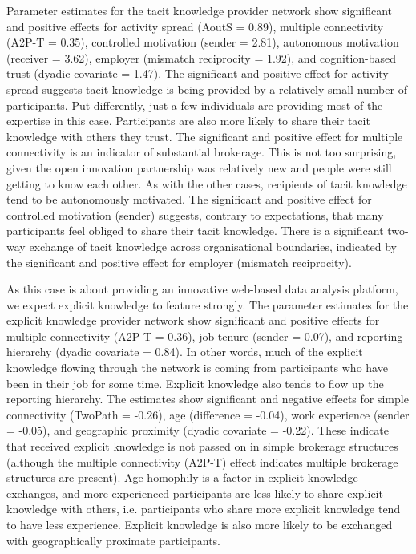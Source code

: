 Parameter estimates for the tacit knowledge provider network show significant and positive effects for activity spread (AoutS = 0.89), multiple connectivity (A2P-T = 0.35), controlled motivation (sender = 2.81), autonomous motivation (receiver = 3.62), employer (mismatch reciprocity = 1.92), and cognition-based trust (dyadic covariate = 1.47). The significant and positive effect for activity spread suggests tacit knowledge is being provided by a relatively small number of participants. Put differently, just a few individuals are providing most of the expertise in this case. Participants are also more likely to share their tacit knowledge with others they trust. The significant and positive effect for multiple connectivity is an indicator of substantial brokerage. This is not too surprising, given the open innovation partnership was relatively new and people were still getting to know each other. As with the other cases, recipients of tacit knowledge tend to be autonomously motivated. The significant and positive effect for controlled motivation (sender) suggests, contrary to expectations, that many participants feel obliged to share their tacit knowledge. There is a significant two-way exchange of tacit knowledge across organisational boundaries, indicated by the significant and positive effect for employer (mismatch reciprocity). \medskip

As this case is about providing an innovative web-based data analysis platform, we expect explicit knowledge to feature strongly. The parameter estimates for the explicit knowledge provider network show significant and positive effects for multiple connectivity (A2P-T = 0.36), job tenure (sender = 0.07), and reporting hierarchy (dyadic covariate = 0.84). In other words, much of the explicit knowledge flowing through the network is coming from participants who have been in their job for some time. Explicit knowledge also tends to flow up the reporting hierarchy. The estimates show significant and negative effects for simple connectivity (TwoPath = -0.26), age (difference = -0.04), work experience (sender = -0.05), and geographic proximity (dyadic covariate = -0.22). These indicate that received explicit knowledge is not passed on in simple brokerage structures (although the multiple connectivity (A2P-T) effect indicates multiple brokerage structures are present). Age homophily is a factor in explicit knowledge exchanges, and more experienced participants are less likely to share explicit knowledge with others, i.e. participants who share more explicit knowledge tend to have less experience. Explicit knowledge is also more likely to be exchanged with geographically proximate participants. \medskip

